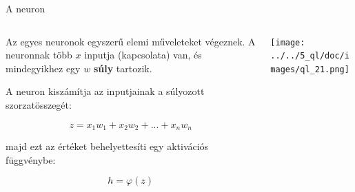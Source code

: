 \documentclass[english, aspectratio=169]{beamer}
\begin{document}
\begin{frame}{A neuron}
\begin{columns}
\begin{column}{.4\textwidth}
Az egyes neuronok egyszerű elemi műveleteket végeznek. A neuronnak több $x$ inputja (kapcsolata) van, és mindegyikhez egy $w$ \textbf{súly} tartozik.\par\smallskip
A neuron kiszámítja az inputjainak a súlyozott szorzatösszegét:
\begin{block}{}
\vspace{-0.7cm}
\[
z=x_1w_1 + x_2w_2 + ... + x_nw_n
\]
\end{block}
majd ezt az értéket behelyettesíti egy aktivációs függvénybe:
\begin{block}{}
\vspace{-0.2cm}
\[
h=\varphi(z)
\]
\end{block}
\end{column}
\begin{column}{.6\textwidth}
\begin{center}
\texttt{[image: ../../5\_ql/doc/images/ql\_21.png]}
\end{center}
\end{column}
\end{columns}
\end{frame}
\end{document}
